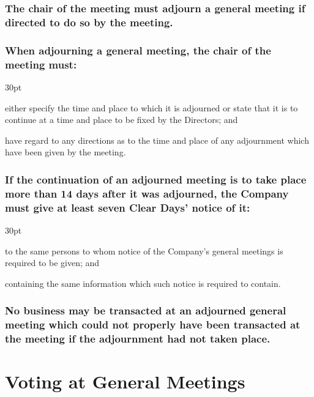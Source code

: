\documentclass[12pt]{article}
\def\clauseindent{30pt}
\newenvironment{subindentpara}{\raggedright\begin{adjustwidth}{\clauseindent}{}\begin{hanginglist}}{\end{hanginglist}\end{adjustwidth}}
\begin{document}
\subsubsection[Adjournment May be Directed at a General Meeting]{The chair of the meeting must adjourn a general meeting if directed to do so by the meeting.}
\subsubsection[Specifics of Adjournment of a General Meeting]{When adjourning a general meeting, the chair of the meeting must:}
\begin{subindentpara}
    \item either specify the time and place to which it is adjourned or state that it is to continue at a time and place to be fixed by the Directors; and
    \item have regard to any directions as to the time and place of any adjournment which have been given by the meeting.
\end{subindentpara}
\subsubsection[Notice and Adjournment]{If the continuation of an adjourned meeting is to take place more than 14 days after it was adjourned, the Company must give at least seven Clear Days' notice of it:}
\begin{subindentpara}
    \item to the same persons to whom notice of the Company's general meetings is required to be given; and
    \item containing the same information which such notice is required to contain.
\end{subindentpara}
\subsubsection[Adjourned Meetings Work Like Non-Adjourned Meetings]{No business may be transacted at an adjourned general meeting which could not properly have been transacted at the meeting if the adjournment had not taken place.}

\vspace{1.5\baselineskip}\section*{Voting at General Meetings}
\end{document}

